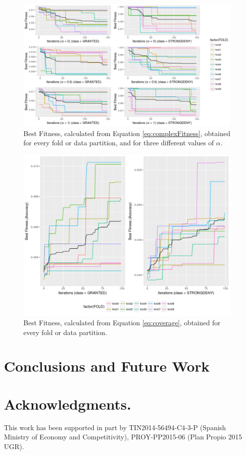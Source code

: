 \documentclass[a4paper,10pt,twocolumn,preprint,3p]{elsarticle}
\begin{document}
\begin{figure}[h!tb]
\centering
\includegraphics[width=\textwidth]{img/list_ind_diff_alpha.pdf}
\caption{Best Fitness, calculated from Equation \ref{eq:complexFitness}, obtained for every fold or data partition, and for three different values of $\alpha$.}
\label{fig:list_ind_diff_alpha}
\end{figure}

\begin{figure}[h!tb]
\centering
\includegraphics[width=\textwidth]{img/list_ind_coverage.pdf}
\caption{Best Fitness, calculated from Equation \ref{eq:coverage}, obtained for every fold or data partition.}
\label{fig:list_ind_coverage}
\end{figure}


\section{Conclusions and Future Work}
\label{sec:future}

\section*{Acknowledgments.}

This work has been supported in part by TIN2014-56494-C4-3-P (Spanish
Ministry of Economy and Competitivity), PROY-PP2015-06 (Plan Propio
2015 UGR).



\end{document}
